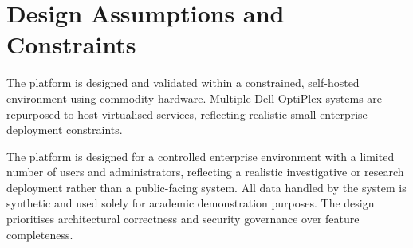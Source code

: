 \section{Design Assumptions and Constraints}

The platform is designed and validated within a constrained, self-hosted environment using commodity hardware\cite{dell}. Multiple Dell OptiPlex systems are repurposed to host virtualised services, reflecting realistic small enterprise deployment constraints.

The platform is designed for a controlled enterprise environment with a limited number of users and administrators, reflecting a realistic investigative or research deployment rather than a public-facing system. All data handled by the system is synthetic and used solely for academic demonstration purposes. The design prioritises architectural correctness and security governance over feature completeness.